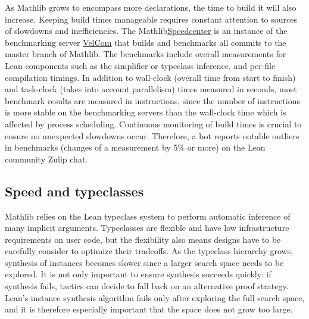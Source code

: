 \documentclass[runningheads]{llncs}
\def\Mathlib{Mathlib\xspace}
\def\mathlib{Mathlib\xspace}
\begin{document}
As \mathlib grows to encompass more declarations, the time to build it will also increase.
Keeping build times manageable requires constant attention to sources of slowdowns and inefficiencies.
The \mathlib \href{https://speed.lean-lang.org/mathlib4/home}{Speedcenter} %
is an instance of the benchmarking server \href{https://github.com/IPDSnelting/velcom}{VelCom}
that builds and benchmarks all commits to the master branch of \mathlib.
The benchmarks include overall measurements for Lean components such as the simplifier or typeclass inference,
and per-file compilation timings.
In addition to wall-clock (overall time from start to finish) and task-clock (takes into account parallelism) times measured in seconds,
most benchmark results are measured in instructions,
since the number of instructions is more stable on the benchmarking servers than the wall-clock time which is affected by process scheduling.
Continuous monitoring of build times is crucial to ensure no unexpected slowdowns occur.
Therefore, a bot reports notable outliers in benchmarks (changes of a measurement by 5\% or more) on the Lean community Zulip chat.

\subsection{Speed and typeclasses} \label{subsec:speed-classes}
\Mathlib relies on the Lean typeclass system to perform automatic inference of many implicit arguments.
Typeclasses are flexible and have low infrastructure requirements on user code, but the flexibility also means designs have to be carefully consider to optimize their tradeoffs.
As the typeclass hierarchy grows, synthesis of instances becomes slower since a larger search space needs to be explored.
It is not only important to ensure synthesis succeeds quickly:
if synthesis fails, tactics can decide to fall back on an alternative proof strategy.
Lean's instance synthesis algorithm fails only after exploring the full search space,
and it is therefore especially important that the space does not grow too large.
\end{document}
